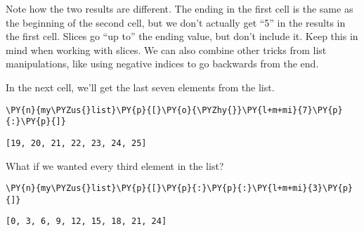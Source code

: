     Note how the two results are different. The ending in the first cell is
the same as the beginning of the second cell, but we don't actually get
``5'' in the results in the first cell. Slices go ``up to'' the ending
value, but don't include it. Keep this in mind when working with slices.
We can also combine other tricks from list manipulations, like using
negative indices to go backwards from the end.

In the next cell, we'll get the last seven elements from the list.

    \begin{tcolorbox}[breakable, size=fbox, boxrule=1pt, pad at break*=1mm,colback=cellbackground, colframe=cellborder]
\begin{Verbatim}[commandchars=\\\{\}]
\PY{n}{my\PYZus{}list}\PY{p}{[}\PY{o}{\PYZhy{}}\PY{l+m+mi}{7}\PY{p}{:}\PY{p}{]}
\end{Verbatim}
\end{tcolorbox}

            \begin{tcolorbox}[breakable, size=fbox, boxrule=.5pt, pad at break*=1mm, opacityfill=0]
\begin{Verbatim}[commandchars=\\\{\}]
[19, 20, 21, 22, 23, 24, 25]
\end{Verbatim}
\end{tcolorbox}
        
    What if we wanted every third element in the list?

    \begin{tcolorbox}[breakable, size=fbox, boxrule=1pt, pad at break*=1mm,colback=cellbackground, colframe=cellborder]
\begin{Verbatim}[commandchars=\\\{\}]
\PY{n}{my\PYZus{}list}\PY{p}{[}\PY{p}{:}\PY{p}{:}\PY{l+m+mi}{3}\PY{p}{]}
\end{Verbatim}
\end{tcolorbox}

            \begin{tcolorbox}[breakable, size=fbox, boxrule=.5pt, pad at break*=1mm, opacityfill=0]
\begin{Verbatim}[commandchars=\\\{\}]
[0, 3, 6, 9, 12, 15, 18, 21, 24]
\end{Verbatim}
\end{tcolorbox}
        
